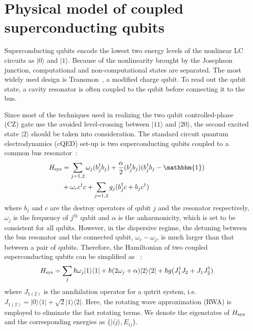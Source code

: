 \documentclass[conference, 9pt]{IEEEtran}
\begin{document}

\section{Physical model of coupled superconducting qubits}
Superconducting qubits encode the lowest two energy levels of the nonlinear LC circuits as $|0\rangle$ and $|1\rangle$.  Because of the nonlinearity brought by the Josephson junction, computational and non-computational states are separated. The most widely used design is Transmon~\cite{Koch_2007}, a modified charge qubit. To read out the qubit state, a cavity resonator is often coupled to the qubit before connecting it to the bus. 

Since most of the techniques used in realizing the two qubit controlled-phase (CZ) gate use the avoided level-crossing between $|11\rangle$ and $|20\rangle$, the second excited state $|2\rangle$ should be taken into consideration. The standard circuit quantum electrodynamics (cQED) set-up is two superconducting qubits coupled to a common bus resonator~\cite{Magesan_2020}:
\begin{equation}
\begin{aligned}
    H_{\rm{sys}} &= \sum_{j = 1,2}\omega_j(b_j^{\dag}b_j) + \frac{\alpha}{2}(b_j^{\dag}b_j)(b_j^{\dag}b_j - \mathbbm{1}) \\
    &+ \omega_r c^{\dag}c + \sum_{j = 1,2}g_j(b_j^{\dag}c +b_j c^{\dag})
\end{aligned}
\end{equation}
where $b_j$ and $c$ are the destroy operators of qubit $j$ and the resonator respectively, $\omega_j$ is the frequency of $j^{th}$ qubit and $\alpha$ is the anharmonicity, which is set to be consistent for all qubits. However, in the dispersive regime, the detuning between the bus resonator and the connected qubit, $\omega_r - \omega_j$, is much larger than that between a pair of qubits. Therefore, the Hamiltonian of two coupled superconducting qubits can be simplified as ~\cite{PhysRevApplied.11.034030}: 
\begin{equation}
    H_{\rm{sys}} = \sum_{j}\hbar \omega_{j}|1\rangle\langle1| + \hbar (2\omega_j + \alpha)|2\rangle\langle2| + \hbar g(J_1^{\dag}J_2+J_1 J_2^{\dag})
\end{equation}
where $J_{1(2)}$ is the annihilation operator for a qutrit system, i.e. $J_{1(2)} = |0\rangle\langle1| + \sqrt{2}|1\rangle\langle2|$.
Here, the rotating wave approximation (RWA) is employed to eliminate the fast rotating terms. We denote the eigenstates of $H_{\rm{sys}}$ and the corresponding energies as $\{|\overline{ij}\rangle, E_{ij}\}$.
\end{document}
